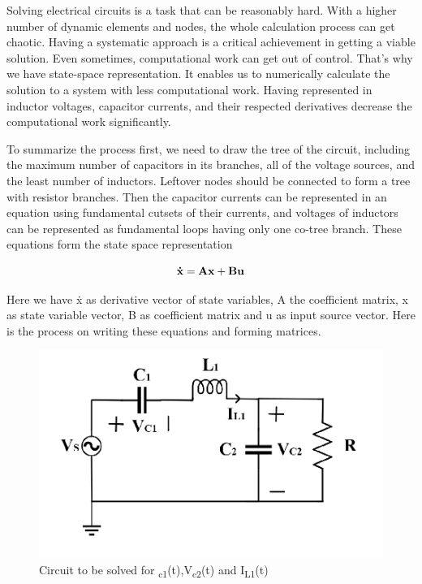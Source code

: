 


\justify


Solving electrical circuits is a task that can be reasonably hard. With a higher number of dynamic elements and nodes, the whole calculation process can get chaotic. Having a systematic approach is a critical achievement in getting a viable solution. Even sometimes, computational work can get out of control. That's why we have state-space representation. It enables us to numerically calculate the solution to a system with less computational work. Having represented in inductor voltages, capacitor currents, and their respected derivatives decrease the computational work significantly.
\par 
\bigskip
To summarize the process first, we need to draw the tree of the circuit, including the maximum number of capacitors in its branches, all of the voltage sources, and the least number of inductors. Leftover nodes should be connected to form a tree with resistor branches. Then the capacitor currents can be represented in an equation using fundamental cutsets of their currents, and voltages of inductors can be represented as fundamental loops having only one co-tree branch. These equations form the state space representation
\par
\begin{equation}
\boldmath
\mathbf{\dot{x}=Ax+Bu}
\end{equation}
\par
Here we have ẋ as derivative vector of state variables, A the coefficient matrix, x as state variable vector, B as coefficient matrix and u as input source vector. Here is the process on writing these equations and forming matrices.
\bigskip

\begin{figure}[h]
\centerline{\includegraphics[scale=.35]{Images/circuit.png}}
\caption{Circuit to be solved for \textsubscript{c1}(t),V\textsubscript{c2}(t) and I\textsubscript{L1}(t)}
\label{fig}
\end{figure}

